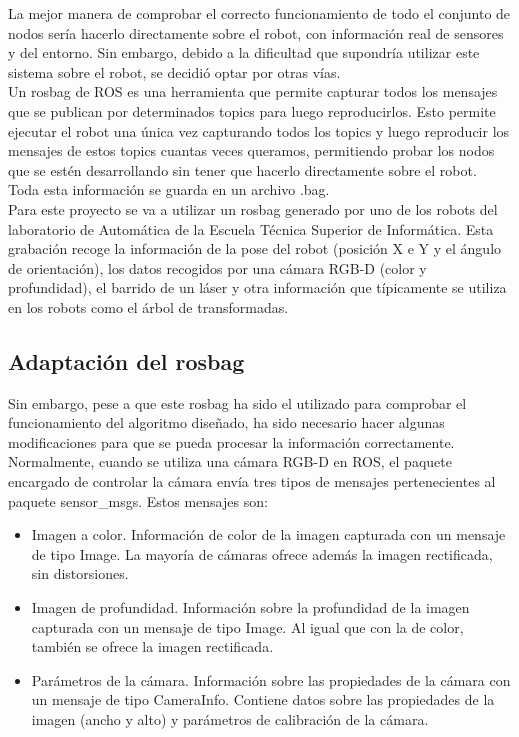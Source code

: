 La mejor manera de comprobar el correcto funcionamiento de todo el conjunto de nodos sería hacerlo directamente sobre el robot, con información real de sensores y del entorno. Sin embargo, debido a la dificultad que supondría utilizar este sistema sobre el robot, se decidió optar por otras vías.\\

Un  rosbag de ROS es una herramienta que permite capturar todos los mensajes que se publican por determinados topics para luego reproducirlos. Esto permite ejecutar el robot una única vez capturando todos los topics y luego reproducir los mensajes de estos topics cuantas veces queramos, permitiendo probar los nodos que se estén desarrollando sin tener que hacerlo directamente sobre el robot. Toda esta información se guarda en un archivo .bag.\\

Para este proyecto se va a utilizar un rosbag generado por uno de los robots del laboratorio de Automática de la Escuela Técnica Superior de Informática. Esta grabación recoge la información de la pose del robot (posición X e Y y el ángulo de orientación), los datos recogidos por una cámara RGB-D (color y profundidad), el barrido de un láser y otra información que típicamente se utiliza en los robots como el árbol de transformadas.\\

\subsection{Adaptación del rosbag}

Sin embargo, pese a que este rosbag ha sido el utilizado para comprobar el funcionamiento del algoritmo diseñado, ha sido necesario hacer algunas modificaciones para que se pueda procesar la información correctamente.\\

Normalmente, cuando se utiliza una cámara RGB-D en ROS, el paquete encargado de controlar la cámara envía tres tipos de mensajes pertenecientes al paquete sensor\_msgs. Estos mensajes son:

\begin{itemize}

	\item Imagen a color. Información de color de la imagen capturada con un mensaje de tipo Image. La mayoría de cámaras ofrece además la imagen rectificada, sin distorsiones.
	\item Imagen de profundidad. Información sobre la profundidad de la imagen capturada con un mensaje de tipo Image. Al igual que con la de color, también se ofrece la imagen rectificada.
	\item Parámetros de la cámara. Información sobre las propiedades de la cámara con un mensaje de tipo CameraInfo. Contiene datos sobre las propiedades de la imagen (ancho y alto) y parámetros de calibración de la cámara.

\end{itemize}

